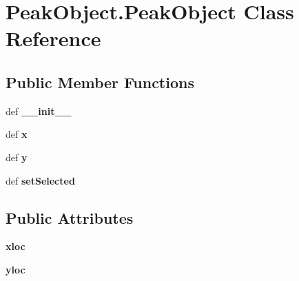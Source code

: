 \hypertarget{classPeakObject_1_1PeakObject}{\section{Peak\-Object.\-Peak\-Object Class Reference}
\label{classPeakObject_1_1PeakObject}
}
\subsection*{Public Member Functions}
\begin{DoxyCompactItemize}
\item 
\hypertarget{classPeakObject_1_1PeakObject_a066c72d23958912081182a5aca95e32c}{def {\bfseries \-\_\-\-\_\-init\-\_\-\-\_\-}}\label{classPeakObject_1_1PeakObject_a066c72d23958912081182a5aca95e32c}

\item 
\hypertarget{classPeakObject_1_1PeakObject_a44e1f82c79582b10885050ae8ffd7201}{def {\bfseries x}}\label{classPeakObject_1_1PeakObject_a44e1f82c79582b10885050ae8ffd7201}

\item 
\hypertarget{classPeakObject_1_1PeakObject_a674a319850462abc76a7091e49c2425c}{def {\bfseries y}}\label{classPeakObject_1_1PeakObject_a674a319850462abc76a7091e49c2425c}

\item 
\hypertarget{classPeakObject_1_1PeakObject_a4a9dabf7ebe3b0703da235f77259d5d2}{def {\bfseries set\-Selected}}\label{classPeakObject_1_1PeakObject_a4a9dabf7ebe3b0703da235f77259d5d2}

\end{DoxyCompactItemize}
\subsection*{Public Attributes}
\begin{DoxyCompactItemize}
\item 
\hypertarget{classPeakObject_1_1PeakObject_a0675bfef330cb0e7111c507d0fd2f505}{{\bfseries xloc}}\label{classPeakObject_1_1PeakObject_a0675bfef330cb0e7111c507d0fd2f505}

\item 
\hypertarget{classPeakObject_1_1PeakObject_adc5441b9bde0d002725032741bce8a3a}{{\bfseries yloc}}\label{classPeakObject_1_1PeakObject_adc5441b9bde0d002725032741bce8a3a}

\end{DoxyCompactItemize}
